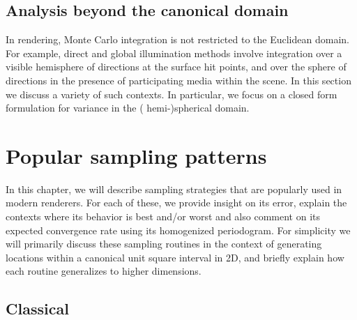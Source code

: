 \documentclass[11pt,fleqn]{book} %
\newcommand{\TBC} {}
\begin{document}
%

%

\section{Analysis beyond the canonical domain}
In rendering, Monte Carlo integration is not restricted to the Euclidean domain. For example, direct and global illumination methods involve integration over a visible  hemisphere of directions at the surface hit points, and over the sphere of directions in the presence of participating media within the scene. In this section we discuss a variety of such contexts. In particular, we focus on a closed form formulation for variance in the ( hemi-)spherical domain. 





% 

\chapter{Popular sampling patterns} \label{ch:stateoftheart}
In this chapter, we will describe sampling strategies that are popularly used in modern renderers. For each of these, we provide insight on its error, explain the contexts where its behavior is best and/or worst and also comment on its expected convergence rate using its homogenized periodogram. For simplicity we will primarily discuss these sampling routines in the context of generating locations within a canonical unit square interval in 2D, and briefly explain how each routine generalizes to higher dimensions. 

\TBC

\section{Classical}
\end{document}

